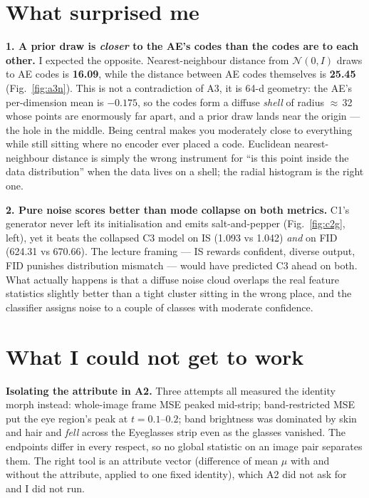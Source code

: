 \documentclass[10pt,twocolumn]{article}
\begin{document}
\section{What surprised me}

\textbf{1. A prior draw is \emph{closer} to the AE's codes than the codes are to each
other.} I expected the opposite. Nearest-neighbour distance from $\mathcal{N}(0,I)$
draws to AE codes is \textbf{16.09}, while the distance between AE codes themselves is
\textbf{25.45} (Fig.~\ref{fig:a3n}). This is not a contradiction of A3, it is 64-d
geometry: the AE's per-dimension mean is $-0.175$, so the codes form a diffuse
\emph{shell} of radius $\approx$\,32 whose points are enormously far apart, and a prior
draw lands near the origin --- the hole in the middle. Being central makes you moderately
close to everything while still sitting where no encoder ever placed a code. Euclidean
nearest-neighbour distance is simply the wrong instrument for ``is this point inside the
data distribution'' when the data lives on a shell; the radial histogram is the right one.

\textbf{2. Pure noise scores better than mode collapse on both metrics.} C1's generator
never left its initialisation and emits salt-and-pepper (Fig.~\ref{fig:c2g}, left), yet
it beats the collapsed C3 model on IS (1.093 vs 1.042) \emph{and} on FID (624.31 vs
670.66). The lecture framing --- IS rewards confident, diverse output, FID punishes
distribution mismatch --- would have predicted C3 ahead on both. What actually happens is
that a diffuse noise cloud overlaps the real feature statistics slightly better than a
tight cluster sitting in the wrong place, and the classifier assigns noise to a couple of
classes with moderate confidence.

\section{What I could not get to work}

\textbf{Isolating the attribute in A2.} Three attempts all measured the identity morph
instead: whole-image frame MSE peaked mid-strip; band-restricted MSE put the eye
region's peak at $t=0.1$--$0.2$; band brightness was dominated by skin and hair and
\emph{fell} across the Eyeglasses strip even as the glasses vanished. The endpoints
differ in every respect, so no global statistic on an image pair separates them. The
right tool is an attribute vector (difference of mean $\mu$ with and without the
attribute, applied to one fixed identity), which A2 did not ask for and I did not run.
\end{document}
